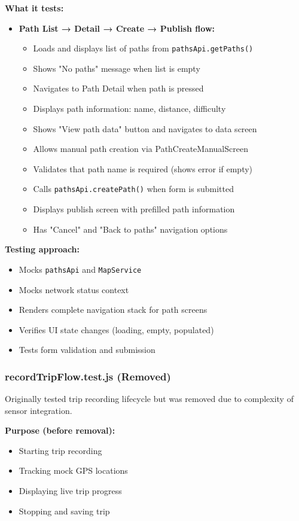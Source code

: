 \textbf{What it tests:}
\begin{itemize}
    \item \textbf{Path List → Detail → Create → Publish flow:}
    \begin{itemize}
        \item Loads and displays list of paths from \texttt{pathsApi.getPaths()}
        \item Shows "No paths" message when list is empty
        \item Navigates to Path Detail when path is pressed
        \item Displays path information: name, distance, difficulty
        \item Shows "View path data" button and navigates to data screen
        \item Allows manual path creation via PathCreateManualScreen
        \item Validates that path name is required (shows error if empty)
        \item Calls \texttt{pathsApi.createPath()} when form is submitted
        \item Displays publish screen with prefilled path information
        \item Has "Cancel" and "Back to paths" navigation options
    \end{itemize}
\end{itemize}

\textbf{Testing approach:}
\begin{itemize}
    \item Mocks \texttt{pathsApi} and \texttt{MapService}
    \item Mocks network status context
    \item Renders complete navigation stack for path screens
    \item Verifies UI state changes (loading, empty, populated)
    \item Tests form validation and submission
\end{itemize}

\subsubsection{recordTripFlow.test.js (Removed)}
\label{subsubsec:record_trip_flow_test}

Originally tested trip recording lifecycle but was removed due to complexity of sensor integration.

\textbf{Purpose (before removal):}
\begin{itemize}
    \item Starting trip recording
    \item Tracking mock GPS locations
    \item Displaying live trip progress
    \item Stopping and saving trip
\end{itemize}

